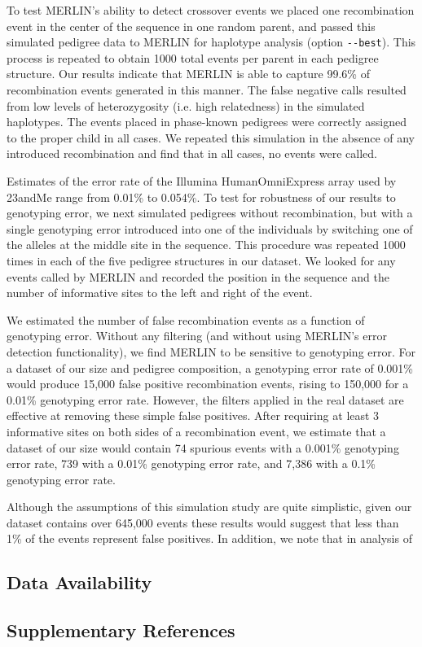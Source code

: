 To test MERLIN's ability to detect crossover events we placed one  
recombination event in the center of the sequence in one random parent, and  
passed this simulated pedigree data to MERLIN for haplotype analysis (option
\verb|--best|).  This process is repeated to obtain 1000 total events per parent in each  
pedigree structure. Our results indicate that MERLIN is able to capture 99.6\% of  
recombination events generated in this manner. The false negative calls resulted  
from low levels of heterozygosity (i.e. high relatedness) in the simulated haplotypes.  
The events placed in phase-known pedigrees were correctly assigned to the proper  
child in all cases. We repeated this simulation in the absence of any introduced  
recombination and find that in all cases, no events were called.  

Estimates of the error rate of the Illumina HumanOmniExpress array used by  
23andMe range from 0.01\%\cite{Illumina2013}  to 0.054\%\cite{Imai2010}.  To test for robustness of our results to  
genotyping error, we next simulated pedigrees without recombination, but with a  
single genotyping error introduced into one of the individuals by switching one of  
the alleles at the middle site in the sequence.  This procedure was repeated 1000  
times in each of the five pedigree structures in our dataset.  We looked for any  
events called by MERLIN and recorded the position in the sequence and the number  
of informative sites to the left and right of the event.    

We estimated the number of false recombination events as a function of  
genotyping error.  Without any filtering (and without using MERLIN's error  
detection functionality), we find MERLIN to be sensitive to genotyping error. For a  
dataset of our size and pedigree composition, a genotyping error rate of 0.001\%  
would produce 15,000 false positive recombination events, rising to 150,000 for a  
0.01\% genotyping error rate. However, the filters applied in the real dataset are  
effective at removing these simple false positives. After requiring at least 3  
informative sites on both sides of a recombination event, we estimate that a dataset  
of our size would contain 74 spurious events with a 0.001\% genotyping error rate,  
739 with a 0.01\% genotyping error rate, and 7,386 with a 0.1\% genotyping error  
rate.   

Although the assumptions of this simulation study are quite simplistic, given  
our dataset contains over 645,000 events these results would suggest that less than  
1\% of the events represent false positives. In addition, we note that in analysis of  

\subsection{Data Availability}

\subsection{Supplementary References}












